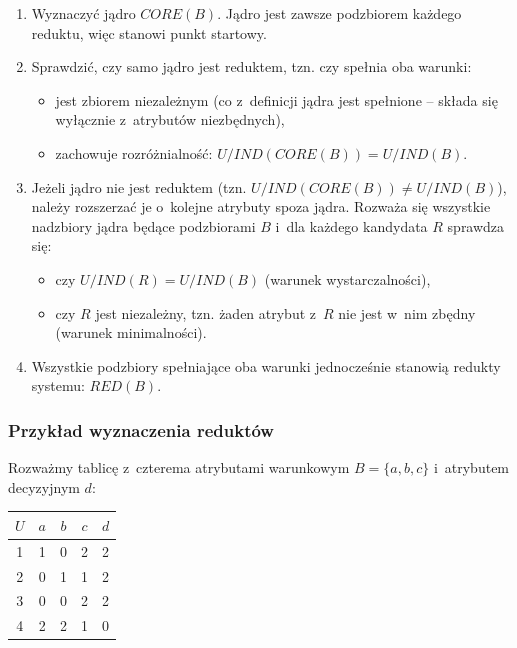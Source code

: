 \documentclass[12pt,a4paper,oneside]{article}
\begin{document}
\begin{enumerate}
    \item Wyznaczyć jądro $CORE(B)$. Jądro jest zawsze podzbiorem każdego reduktu, więc stanowi punkt startowy.
    \item Sprawdzić, czy samo jądro jest reduktem, tzn. czy spełnia oba warunki:
    \begin{itemize}
        \item jest zbiorem niezależnym (co z~definicji jądra jest spełnione -- składa się wyłącznie z~atrybutów niezbędnych),
        \item zachowuje rozróżnialność: $U/IND(CORE(B)) = U/IND(B)$.
    \end{itemize}
    \item Jeżeli jądro nie jest reduktem (tzn. $U/IND(CORE(B)) \neq U/IND(B)$), należy rozszerzać je o~kolejne atrybuty spoza jądra. Rozważa się wszystkie nadzbiory jądra będące podzbiorami $B$ i~dla każdego kandydata $R$ sprawdza się:
    \begin{itemize}
        \item czy $U/IND(R) = U/IND(B)$ (warunek wystarczalności),
        \item czy $R$ jest niezależny, tzn. żaden atrybut z~$R$ nie jest w~nim zbędny (warunek minimalności).
    \end{itemize}
    \item Wszystkie podzbiory spełniające oba warunki jednocześnie stanowią redukty systemu: $RED(B)$.
\end{enumerate}

\subsubsection{Przykład wyznaczenia reduktów}

Rozważmy tablicę z~czterema atrybutami warunkowym $B = \{a, b, c\}$ i~atrybutem decyzyjnym $d$:

\begin{table}[h]
\centering
\begin{tabular}{|c|c|c|c|c|}
\hline
$U$ & $a$ & $b$ & $c$ & $d$ \\
\hline
1 & 1 & 0 & 2 & 2 \\
2 & 0 & 1 & 1 & 2 \\
3 & 0 & 0 & 2 & 2 \\
4 & 2 & 2 & 1 & 0 \\
\hline
\end{tabular}
\end{table}
\end{document}
